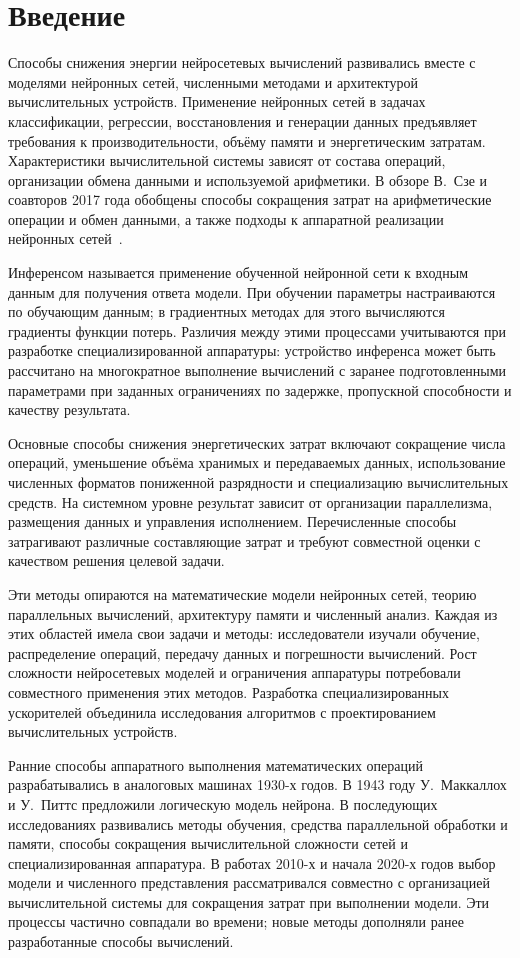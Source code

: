 \section*{Введение}

Способы снижения энергии нейросетевых вычислений развивались вместе
с моделями нейронных сетей, численными методами и архитектурой
вычислительных устройств. Применение нейронных сетей в задачах классификации,
регрессии, восстановления и генерации данных предъявляет требования
к производительности, объёму памяти и энергетическим затратам.
Характеристики вычислительной системы зависят от состава операций, организации
обмена данными и используемой арифметики. В обзоре В.~Сзе
и соавторов 2017 года обобщены способы сокращения затрат
на арифметические операции и обмен данными, а также подходы
к аппаратной реализации нейронных сетей~\cite{sze2017}.

Инференсом называется применение обученной нейронной сети к входным данным
для получения ответа модели. При обучении параметры настраиваются
по обучающим данным; в градиентных методах для этого вычисляются
градиенты функции потерь. Различия между этими процессами
учитываются при разработке специализированной аппаратуры: устройство инференса
может быть рассчитано на многократное выполнение вычислений
с заранее подготовленными параметрами при заданных ограничениях
по задержке, пропускной способности
и качеству результата.

Основные способы снижения энергетических затрат включают сокращение
числа операций, уменьшение объёма хранимых и передаваемых данных,
использование численных форматов пониженной разрядности и специализацию
вычислительных средств. На системном уровне результат зависит
от организации параллелизма, размещения данных и управления исполнением.
Перечисленные способы затрагивают различные составляющие затрат
и требуют совместной оценки с качеством решения целевой задачи.

Эти методы опираются на математические модели нейронных сетей, теорию
параллельных вычислений, архитектуру памяти и численный анализ. Каждая из этих
областей имела свои задачи и методы: исследователи изучали
обучение, распределение операций, передачу данных и погрешности вычислений.
Рост сложности нейросетевых моделей и ограничения аппаратуры потребовали
совместного применения этих методов. Разработка специализированных ускорителей
объединила исследования алгоритмов с проектированием вычислительных устройств.

Ранние способы аппаратного выполнения математических операций
разрабатывались в аналоговых машинах 1930-х годов.
В 1943 году У.~Маккаллох и У.~Питтс предложили логическую модель
нейрона. В последующих исследованиях развивались методы обучения,
средства параллельной обработки и памяти, способы сокращения
вычислительной сложности сетей и специализированная аппаратура.
В работах 2010-х и начала 2020-х годов выбор модели и численного
представления рассматривался совместно с организацией вычислительной
системы для сокращения затрат при выполнении модели.
Эти процессы частично совпадали во времени; новые методы дополняли ранее
разработанные способы вычислений.

